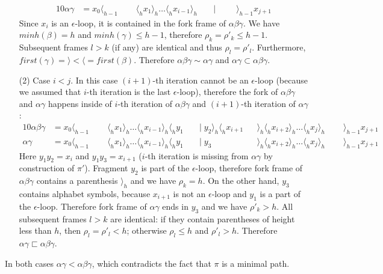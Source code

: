\documentclass[AMA,STIX1COL]{WileyNJD-v2}
\newcommand{\Xl}{\langle}
\newcommand{\Xr}{\rangle}
\begin{document}
\begin{proofEnd}
\begin{enumerate}[itemsep=0.5em, topsep=0.5em]
\begin{alignat*}{10}
            \alpha \gamma       &= x_0 \Xl_{h-1} \;&&\; \Xl_h x_1 \Xr_h \hdots \Xl_h x_{i-1} \Xr_h \;&&\big|\;                   \;&&\; \Xr_{h-1} x_{j+1}
        \end{alignat*}
        Since $x_i$ is an $\epsilon$-loop, it is contained in the fork frame of $\alpha \beta \gamma$.
        We have $minh (\beta) = h$ and $minh (\gamma) \leq h - 1$, therefore $\rho_k = \rho'_k \leq h - 1$.
        Subsequent frames $l > k$ (if any) are identical and thus $\rho_l = \rho'_l$.
        Furthermore, $first (\gamma) = \Xr < \Xl = first (\beta)$.
        Therefore $\alpha \beta \gamma \sim \alpha \gamma$ and $\alpha \gamma \subset \alpha \beta \gamma$.

    \item[(2)]
        Case $i < j$.
        In this case $(i + 1)$-th iteration cannot be an $\epsilon$-loop
        (because we assumed that $i$-th iteration is the last $\epsilon$-loop),
        therefore the fork of $\alpha \beta \gamma$ and $\alpha \gamma$ happens
        inside of $i$-th iteration of $\alpha \beta \gamma$
        and $(i + 1)$-th iteration of $\alpha \gamma$:
        \begin{alignat*}{10}
            \alpha \beta \gamma &= x_0 \Xl_{h-1} \;&&\; \Xl_h x_1 \Xr_h \hdots \Xl_h x_{i-1} \Xr_h \Xl_h y_1 \;&&\big|\; y_2 \Xr_h \Xl_h x_{i+1} && \Xr_h \Xl_h x_{i+2} \Xr_h \hdots \Xl_h x_j \Xr_h \;&&\; \Xr_{h-1} x_{j+1} \\[-0.5em]
            \alpha \gamma       &= x_0 \Xl_{h-1} \;&&\; \Xl_h x_1 \Xr_h \hdots \Xl_h x_{i-1} \Xr_h \Xl_h y_1 \;&&\big|\; y_3                     && \Xr_h \Xl_h x_{i+2} \Xr_h \hdots \Xl_h x_j \Xr_h \;&&\; \Xr_{h-1} x_{j+1}
        \end{alignat*}
        Here $y_1 y_2 = x_i$ and $y_1 y_3 = x_{i+1}$ ($i$-th iteration is missing from $\alpha \gamma$ by construction of $\pi'$).
        Fragment $y_2$ is part of the $\epsilon$-loop,
        therefore fork frame of $\alpha \beta \gamma$ contains a parenthesis $\Xr_h$ and we have $\rho_k = h$.
        On the other hand, $y_3$ contains alphabet symbols,
        because $x_{i+1}$ is not an $\epsilon$-loop and $y_1$ is a part of the $\epsilon$-loop.
        Therefore fork frame of $\alpha \gamma$ ends in $y_3$ and we have $\rho'_k > h$.
        All subsequent frames $l > k$ are identical:
        if they contain parentheses of height less than $h$, then $\rho_l = \rho'_l < h$;
        otherwise $\rho_l \leq h$ and $\rho'_l > h$.
        Therefore $\alpha \gamma \sqsubset \alpha \beta \gamma$.
    \end{enumerate}
    In both cases $\alpha \gamma < \alpha \beta \gamma$,
    which contradicts the fact that $\pi$ is a minimal path.
\end{proofEnd}
\end{document}

